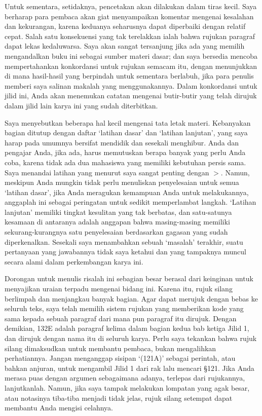 Untuk sementara,
setidaknya, pencetakan akan dilakukan dalam tiras kecil.   Saya berharap para
pembaca akan giat menyampaikan komentar mengenai kesalahan dan kekurangan,
karena keduanya seharusnya dapat diperbaiki dengan relatif cepat.   Salah satu
konsekuensi yang tak terelakkan ialah bahwa rujukan paragraf dapat lekas
kedaluwarsa.   Saya akan sangat tersanjung jika ada yang memilih mengandalkan
buku ini sebagai sumber materi dasar;  dan saya bersedia mencoba
mempertahankan konkordansi untuk rujukan semacam itu, dengan menunjukkan di
mana hasil-hasil yang berpindah untuk sementara berlabuh, jika para penulis
memberi saya salinan makalah yang menggunakannya.   Dalam konkordansi untuk 
jilid ini, Anda akan menemukan catatan mengenai butir-butir yang telah dirujuk
dalam jilid lain karya ini yang sudah diterbitkan.
     
Saya menyebutkan beberapa hal kecil mengenai tata letak materi.
Kebanyakan bagian ditutup dengan daftar `latihan dasar' dan
`latihan lanjutan', yang saya harap pada umumnya bersifat mendidik dan
sesekali menghibur.   Anda dan pengajar Anda, jika ada, harus memutuskan
berapa banyak yang perlu Anda coba, karena tidak ada dua mahasiswa yang
memiliki kebutuhan persis sama.   Saya menandai latihan yang menurut saya
sangat penting dengan $\pmb{>}$.   Namun, meskipun Anda mungkin tidak perlu
menuliskan penyelesaian untuk semua `latihan dasar', jika Anda meragukan
kemampuan Anda untuk melakukannya, anggaplah ini sebagai peringatan untuk
sedikit memperlambat langkah.   `Latihan lanjutan' memiliki tingkat kesulitan
yang tak berbatas,
dan satu-satunya kesamaan di antaranya adalah anggapan bahwa masing-masing
memiliki sekurang-kurangnya satu penyelesaian berdasarkan gagasan yang sudah
diperkenalkan.   Sesekali saya menambahkan sebuah `masalah' terakhir,
suatu pertanyaan yang jawabannya tidak saya ketahui dan yang tampaknya muncul
secara alami dalam perkembangan karya ini.
     
Dorongan untuk menulis risalah ini sebagian besar berasal dari keinginan
untuk menyajikan uraian terpadu mengenai bidang ini.   Karena itu, rujuk silang
berlimpah dan menjangkau banyak bagian.  Agar dapat merujuk dengan bebas ke
seluruh
teks, saya telah memilih sistem rujukan yang memberikan kode yang sama kepada
sebuah paragraf dari mana pun paragraf itu dirujuk.   Dengan demikian, 132E
adalah paragraf kelima dalam bagian kedua bab ketiga Jilid 1, dan dirujuk
dengan nama itu di seluruh karya.
Perlu saya tekankan bahwa rujuk silang dimaksudkan untuk membantu pembaca,
bukan mengalihkan perhatiannya.   Jangan menganggap sisipan `(121A)' sebagai
perintah, atau bahkan anjuran, untuk mengambil Jilid 1 dari rak lalu mencari
\S121.   Jika Anda merasa puas dengan argumen sebagaimana adanya,
terlepas dari rujukannya, lanjutkanlah.   Namun, jika saya tampak
melakukan lompatan yang agak besar, atau notasinya tiba-tiba menjadi
tidak jelas, rujuk silang setempat dapat membantu Anda mengisi celahnya.
     
